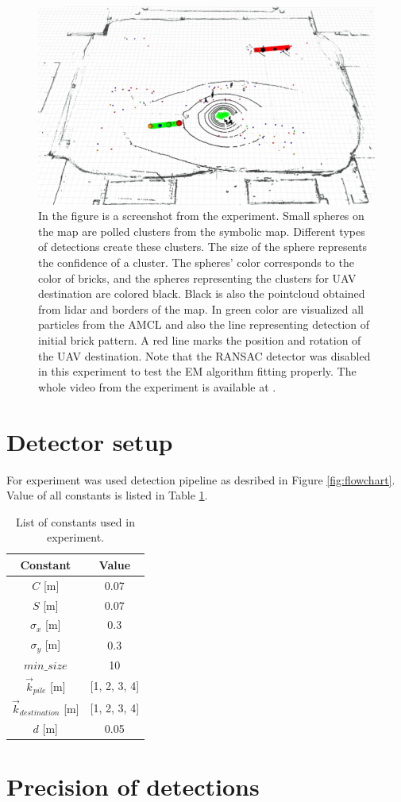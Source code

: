 \begin{figure}[H]
	\centering
	\includegraphics[scale=0.3]{fig/experiment}
	\caption[Experiment results]{In the figure is a screenshot from the experiment. Small spheres on the map are polled clusters from the symbolic map. Different types of detections create these clusters. The size of the sphere represents the confidence of a cluster. The spheres' color corresponds to the color of bricks, and the spheres representing the clusters for UAV destination are colored black. Black is also the pointcloud obtained from lidar and borders of the map. In green color are visualized all particles from the AMCL and also the line representing detection of initial brick pattern. A red line marks the position and rotation of the UAV destination. Note that the RANSAC detector was disabled in this experiment to test the EM algorithm fitting properly. The whole video from the experiment is available at \footnotemark.}
	\label{fig:experiment}
\end{figure}

\section{Detector setup}
For experiment was used detection pipeline as desribed in Figure \ref{fig:flowchart}. Value of all constants is listed in Table \ref{tab:constants}.

\begin{table}[H]
	\centering
	\begin{tabular}{cc}
		\toprule
		Constant & Value \\
		\midrule
		$C$ [m] & 0.07   \\ 
		$S$ [m] & 0.07  \\
		$\sigma_x$ [m] & 0.3 \\ 
		$\sigma_y$ [m] & 0.3    \\ 
		$min\_size$ & 10 \\
		$\vec{k}_{pile} $ [m] & [1, 2, 3, 4] \\
		$\vec{k}_{destination}$ [m] & [1, 2, 3, 4] \\
		$d$ [m] & 0.05 \\
		\bottomrule
	\end{tabular}
	\caption{List of constants used in experiment.}
	\label{tab:constants}
\end{table}

\section{Precision of detections}


\newpage